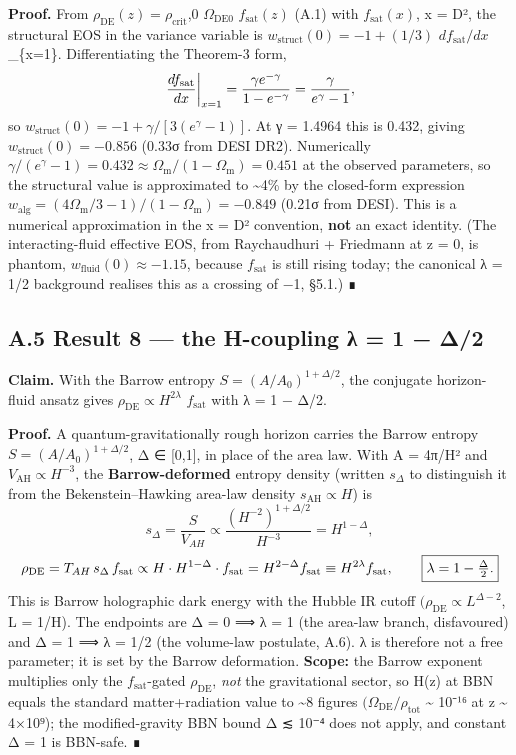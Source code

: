 \documentclass[
  10pt,
]{article}
\begin{document}
\textbf{Proof.} From
\(\rho _{\mathrm{DE}}(z) = \rho _{\mathrm{crit}}\),0
\(\Omega _{\mathrm{DE0}}\) \(f_{\mathrm{sat}}(z)\) (A.1) with
\(f_{\mathrm{sat}}(x)\), x = D², the structural EOS in the variance
variable is \(w_{\mathrm{struct}}(0) = -1 + (1/3)\)
\(df_{\mathrm{sat}}/dx\)\textbar\_\{x=1\}. Differentiating the Theorem-3
form,
\[\left.\frac{df_{\rm sat}}{dx}\right|_{x=1} = \frac{\gamma e^{-\gamma}}{1 - e^{-\gamma}} = \frac{\gamma}{e^\gamma - 1},\]
so \(w_{\mathrm{struct}}(0) = -1 + \gamma /[3(e^{\gamma } - 1)]\). At γ
= 1.4964 this is 0.432, giving
\textbf{\(w_{\mathrm{struct}}(0) = -0.856\)} (0.33σ from DESI DR2).
Numerically
\(\gamma /(e^{\gamma } - 1) = 0.432 \approx  \Omega _{\mathrm{m}}/(1 - \Omega _{\mathrm{m}}) = 0.451\)
at the observed parameters, so the structural value is approximated to
\textasciitilde4\% by the closed-form expression
\(w_{\mathrm{alg}} = (4\Omega _{\mathrm{m}}/3 - 1)/(1 - \Omega _{\mathrm{m}}) = -0.849\)
(0.21σ from DESI). This is a numerical approximation in the x = D²
convention, \textbf{not} an exact identity. (The interacting-fluid
effective EOS, from Raychaudhuri + Friedmann at z = 0, is phantom,
\(w_{\mathrm{fluid}}(0) \approx  -1.15\), because \(f_{\mathrm{sat}}\)
is still rising today; the canonical λ = 1/2 background realises this as
a crossing of −1, §5.1.) ∎

\subsection{A.5 Result 8 --- the H-coupling λ = 1 −
Δ/2}\label{a.5-result-8-the-h-coupling-ux3bb-1-ux3b42}

\textbf{Claim.} With the Barrow entropy \(S = (A/A_{0})^{1+\Delta /2}\),
the conjugate horizon-fluid ansatz gives
\(\rho _{\mathrm{DE}} \propto  H^{2\lambda }\) \(f_{\mathrm{sat}}\) with
λ = 1 − Δ/2.

\textbf{Proof.} A quantum-gravitationally rough horizon carries the
Barrow entropy \(S = (A/A_{0})^{1+\Delta /2}\), Δ ∈ {[}0,1{]}, in place
of the area law. With A = 4π/H² and \(V_{\mathrm{AH}} \propto  H^{-3}\),
the \textbf{Barrow-deformed} entropy density (written \(s_\Delta\) to
distinguish it from the Bekenstein--Hawking area-law density
\(s_{\mathrm{AH}} \propto  H\)) is
\[s_{\Delta} = \frac{S}{V_{AH}} \propto \frac{(H^{-2})^{1+\Delta/2}}{H^{-3}} = H^{1-\Delta},\]
\[\rho_{\rm DE} = T_{AH}\,s_{\Delta}\,f_{\rm sat} \propto H\cdot H^{1-\Delta}\cdot f_{\rm sat}
= H^{2-\Delta}f_{\rm sat} \equiv H^{2\lambda}f_{\rm sat}, \qquad \boxed{\lambda = 1 - \tfrac{\Delta}{2}.}\]
This is Barrow holographic dark energy with the Hubble IR cutoff
\((\rho _{\mathrm{DE}} \propto  L^{\Delta -2}\), L = 1/H). The endpoints
are Δ = 0 ⟹ λ = 1 (the area-law branch, disfavoured) and Δ = 1 ⟹ λ = 1/2
(the volume-law postulate, A.6). λ is therefore not a free parameter; it
is set by the Barrow deformation. \textbf{Scope:} the Barrow exponent
multiplies only the \(f_{\mathrm{sat}}\)-gated \(\rho _{\mathrm{DE}}\),
\emph{not} the gravitational sector, so H(z) at BBN equals the standard
matter+radiation value to \textasciitilde8 figures
\((\Omega _{\mathrm{DE}}/\rho _{\mathrm{tot}}\) \textasciitilde{} 10⁻¹⁶
at z \textasciitilde{} 4×10⁹); the modified-gravity BBN bound Δ ≲ 10⁻⁴
does not apply, and constant Δ = 1 is BBN-safe. ∎
\end{document}
